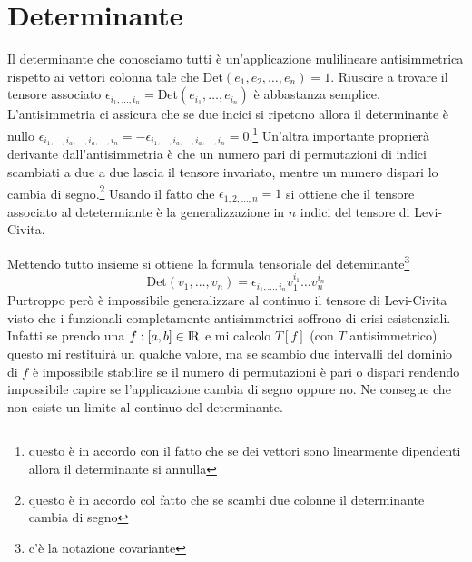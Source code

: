 \documentclass[11pt,a4paper]{report}
\theoremstyle{definition}
\theoremstyle{plain}
\theoremstyle{plain}
\begin{document}
		\section{Determinante}
		\label{sec:det}
			Il determinante che conosciamo tutti è un'applicazione mulilineare antisimmetrica rispetto ai vettori colonna tale che Det$(e_1,e_2,\dots,e_n)=1$.\newline
			Riuscire a trovare il tensore associato $\epsilon_{i_1,\dots,i_n}=$Det$(e_{i_1},\dots,e_{i_n})$ è abbastanza semplice.\newline
			L'antisimmetria ci assicura che se due incici si ripetono allora il determinante è nullo $\epsilon_{i_1,\dots,i_a,\dots,i_a,\dots,i_n}=-\epsilon_{i_1,\dots,i_a,\dots,i_a,\dots,i_n}=0$.\footnote{questo è in accordo con il fatto che se dei vettori sono linearmente dipendenti allora il determinante si annulla}\newline
			Un'altra importante proprierà derivante dall'antisimmetria è che un numero pari di permutazioni di indici scambiati a due a due lascia il tensore invariato, mentre un numero dispari lo cambia di segno.\footnote{questo è in accordo col fatto che se scambi due colonne il determinante cambia di segno}\newline
			Usando il fatto che $\epsilon_{1,2,\dots,n}=1$ si ottiene che il tensore associato al detetermiante è la generalizzazione in $n$ indici del tensore di Levi-Civita.\newline

			Mettendo tutto insieme si ottiene la formula tensoriale del deteminante\footnote{c'è la notazione covariante}
			\begin{equation}
				\textrm{Det}(v_1,\dots,v_n)=\epsilon_{i_1,\dots,i_n}v_1^{i_1}\dots v_n^{i_n}
			\end{equation}
			Purtroppo però è impossibile generalizzare al continuo il tensore di Levi-Civita visto che i funzionali completamente antisimmetrici soffrono di crisi esistenziali.\newline
			Infatti se prendo una $f:[a,b]\in\rm I\!R$ e mi calcolo $T[f]$ (con $T$ antisimmetrico) questo mi restituirà un qualche valore, ma se scambio due intervalli del dominio di $f$ è impossibile stabilire se il numero di permutazioni è pari o dispari rendendo impossibile capire se l'applicazione cambia di segno oppure no. Ne consegue che non esiste un limite al continuo del determinante.
\end{document}
